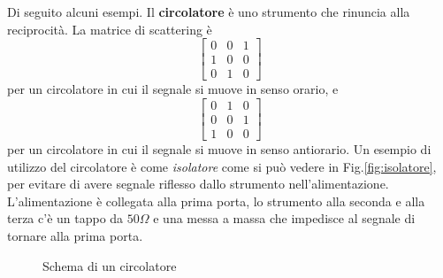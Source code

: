 \documentclass{article}
\begin{document}
Di seguito alcuni esempi.
Il \textbf{circolatore} è uno strumento che rinuncia alla reciprocità.
La matrice di scattering è 
\begin{equation*}
    \begin{bmatrix} 
        0 & 0 & 1 \\
        1 & 0 & 0 \\
        0 & 1 & 0
    \end{bmatrix} 
\end{equation*}
per un circolatore in cui il segnale si muove in senso orario, e
\begin{equation*}
    \begin{bmatrix} 
        0 & 1 & 0 \\
        0 & 0 & 1 \\
        1 & 0 & 0 
    \end{bmatrix} 
\end{equation*}
per un circolatore in cui il segnale si muove in senso antiorario.
Un esempio di utilizzo del circolatore è come \textit{isolatore} come si può vedere in Fig.\ref{fig:isolatore}, per evitare di avere segnale riflesso dallo strumento nell'alimentazione.
L'alimentazione è collegata alla prima porta, lo strumento alla seconda e alla terza c'è un tappo da $50 \Omega$ e una messa a massa che impedisce al segnale di tornare alla prima porta. 

\begin{figure}[htbp]
    \centering
    \caption{Schema di un circolatore} 
    \label{fig:circolatore}
\end{figure}
\end{document}
